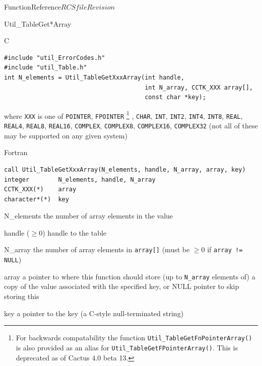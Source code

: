\begin{cactuspart}{FunctionReference}{$RCSfile$}{$Revision$}
\begin{FunctionDescription}{Util\_TableGet*Array}
\begin{SynopsisSection}
\begin{Synopsis}{C}
\begin{verbatim}
#include "util_ErrorCodes.h"
#include "util_Table.h"
int N_elements = Util_TableGetXxxArray(int handle,
                                       int N_array, CCTK_XXX array[],
                                       const char *key);
\end{verbatim}
where \verb|XXX| is one of
   \verb|POINTER|, \verb|FPOINTER|%
\footnote{%
	 For backwards compatability the function
	 {\tt Util\_TableGetFnPointerArray()} is also provided
	 as an alias for {\tt Util\_TableGetFPointerArray()}.
	 This is deprecated as of Cactus 4.0 beta 13.
	 }%
,
   \verb|CHAR|,
   \verb|INT|, \verb|INT2|, \verb|INT4|, \verb|INT8|,
   \verb|REAL|, \verb|REAL4|, \verb|REAL8|, \verb|REAL16|,
   \verb|COMPLEX|, \verb|COMPLEX8|, \verb|COMPLEX16|, \verb|COMPLEX32|
(not all of these may be supported on any given system)
\end{Synopsis}
\begin{Synopsis}{Fortran}
\begin{verbatim}
call Util_TableGetXxxArray(N_elements, handle, N_array, array, key)
integer        N_elements, handle, N_array
CCTK_XXX(*)    array
character*(*)  key
\end{verbatim}
\end{Synopsis}
\end{SynopsisSection}

\begin{ResultSection}
\begin{Result}{N\_elements}
the number of array elements in the value
\end{Result}
\end{ResultSection}

\begin{ParameterSection}
\begin{Parameter}{handle ($\ge 0$)}
handle to the table
\end{Parameter}
\begin{Parameter}{N\_array}
the number of array elements in \verb|array[]|
(must be $\ge 0$ if \verb|array != NULL|)
\end{Parameter}
\begin{Parameter}{array}
a pointer to where this function should store (up to \verb|N_array|
elements of) a copy of the value associated with the specified key,
or NULL pointer to skip storing this
\end{Parameter}
\begin{Parameter}{key}
a pointer to the key (a C-style null-terminated string)
\end{Parameter}
\end{ParameterSection}


\end{FunctionDescription}
\end{cactuspart}
